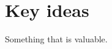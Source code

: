\documentclass{article}
\begin{document}
\section{Key ideas}

Something that is valuable.
\begin{align}
\end{align}
\end{document}
